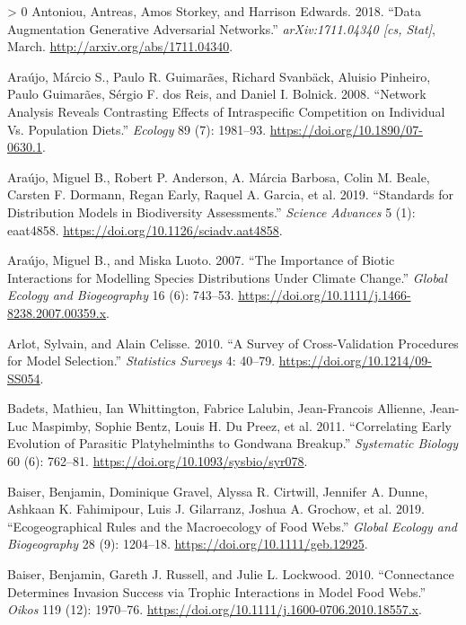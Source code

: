 \documentclass[10pt,oneside]{article}
\newlength{\cslhangindent}
\newenvironment{CSLReferences}[3] %
 {%
  \setlength{\parindent}{0pt}
  \ifodd #1 \everypar{\setlength{\hangindent}{\cslhangindent}}\ignorespaces\fi
  \ifnum #2 > 0
  \setlength{\parskip}{#2\baselineskip}
  \fi
 }%
 {}
\begin{document}
\begin{CSLReferences}{1}{0}
\leavevmode\hypertarget{ref-Antoniou2018DatAug}{}%
Antoniou, Antreas, Amos Storkey, and Harrison Edwards. 2018. {``Data
Augmentation Generative Adversarial Networks.''} \emph{arXiv:1711.04340
{[}cs, Stat{]}}, March. \url{http://arxiv.org/abs/1711.04340}.

\leavevmode\hypertarget{ref-Araujo2008NetAna}{}%
Araújo, Márcio S., Paulo R. Guimarães, Richard Svanbäck, Aluisio
Pinheiro, Paulo Guimarães, Sérgio F. dos Reis, and Daniel I. Bolnick.
2008. {``Network Analysis Reveals Contrasting Effects of Intraspecific
Competition on Individual Vs. Population Diets.''} \emph{Ecology} 89
(7): 1981--93. \url{https://doi.org/10.1890/07-0630.1}.

\leavevmode\hypertarget{ref-Araujo2019StaDis}{}%
Araújo, Miguel B., Robert P. Anderson, A. Márcia Barbosa, Colin M.
Beale, Carsten F. Dormann, Regan Early, Raquel A. Garcia, et al. 2019.
{``Standards for Distribution Models in Biodiversity Assessments.''}
\emph{Science Advances} 5 (1): eaat4858.
\url{https://doi.org/10.1126/sciadv.aat4858}.

\leavevmode\hypertarget{ref-Araujo2007ImpBio}{}%
Araújo, Miguel B., and Miska Luoto. 2007. {``The Importance of Biotic
Interactions for Modelling Species Distributions Under Climate
Change.''} \emph{Global Ecology and Biogeography} 16 (6): 743--53.
\url{https://doi.org/10.1111/j.1466-8238.2007.00359.x}.

\leavevmode\hypertarget{ref-Arlot2010SurCro}{}%
Arlot, Sylvain, and Alain Celisse. 2010. {``A Survey of Cross-Validation
Procedures for Model Selection.''} \emph{Statistics Surveys} 4: 40--79.
\url{https://doi.org/10.1214/09-SS054}.

\leavevmode\hypertarget{ref-Badets2011CorEar}{}%
Badets, Mathieu, Ian Whittington, Fabrice Lalubin, Jean-Francois
Allienne, Jean-Luc Maspimby, Sophie Bentz, Louis H. Du Preez, et al.
2011. {``Correlating Early Evolution of Parasitic Platyhelminths to
Gondwana Breakup.''} \emph{Systematic Biology} 60 (6): 762--81.
\url{https://doi.org/10.1093/sysbio/syr078}.

\leavevmode\hypertarget{ref-Baiser2019EcoRul}{}%
Baiser, Benjamin, Dominique Gravel, Alyssa R. Cirtwill, Jennifer A.
Dunne, Ashkaan K. Fahimipour, Luis J. Gilarranz, Joshua A. Grochow, et
al. 2019. {``Ecogeographical Rules and the Macroecology of Food Webs.''}
\emph{Global Ecology and Biogeography} 28 (9): 1204--18.
\url{https://doi.org/10.1111/geb.12925}.

\leavevmode\hypertarget{ref-Baiser2010ConDet}{}%
Baiser, Benjamin, Gareth J. Russell, and Julie L. Lockwood. 2010.
{``Connectance Determines Invasion Success via Trophic Interactions in
Model Food Webs.''} \emph{Oikos} 119 (12): 1970--76.
\url{https://doi.org/10.1111/j.1600-0706.2010.18557.x}.


\end{CSLReferences}
\end{document}
